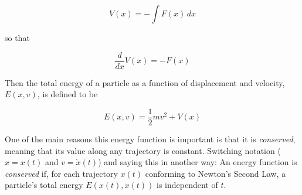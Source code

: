 \documentclass{article}
\theoremstyle{definition}
\begin{document}
\smallskip
\begin{equation}
V(x) = - \int F(x) \, dx
\label{eqn:V(x)}
\end{equation}

\noindent
so that 

\begin{equation}
\dfrac{d}{dx}V(x) = -F(x)
\label{eqn:F}
\end{equation}

\bigskip
\noindent
Then the total energy of a particle as a function of displacement 
and velocity, $E(x,v)$, is defined to be 

\begin{equation}
E(x,v) = \dfrac{1}{2}mv^{2} + V(x)
\label{eqn:E}
\end{equation}

\medskip
\noindent
One of the main reasons this energy function is important is that it is 
\emph{conserved}, meaning that its value along any trajectory is constant.
Switching notation ($x = x(t)$ and $v = \dot{x}(t)$) and saying this in 
another way: An energy function is \emph{conserved} if, for each trajectory 
$x(t)$ conforming to Newton’s Second Law, a particle's total energy 
$E(x(t),\dot{x}(t))$ is independent of $t$.
\end{document}
